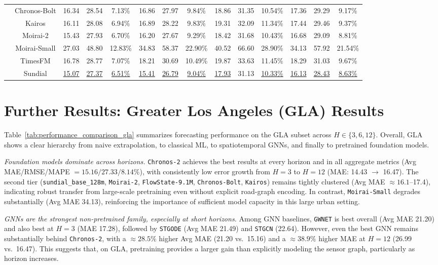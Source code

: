 \documentclass[10pt]{article}
\begin{document}
\begin{table}[t]
{\begin{tabular}{c|c|c|c|c|c|c|c|c|c|c|c|c|c}
& Chronos-Bolt & 16.34 & 28.54 & 7.13\% & 16.86 & 27.97 & 9.84\% & 18.86 & 31.35 & 10.54\% & 17.36 & 29.29 & 9.17\% \\
& Kairos & 16.11 & 28.08 & 6.94\% & 16.89 & 28.22 & 9.83\% & 19.31 & 32.09 & 11.34\% & 17.44 & 29.46 & 9.37\% \\
& Moirai-2 & 15.43 & 27.93 & 6.70\% & 16.20 & 27.67 & 9.29\% & 18.42 & 31.68 & 10.43\% & 16.68 & 29.09 & 8.81\% \\
& Moirai-Small & 27.03 & 48.80 & 12.83\% & 34.83 & 58.37 & 22.90\% & 40.52 & 66.60 & 28.90\% & 34.13 & 57.92 & 21.54\% \\
& TimesFM & 16.78 & 28.77 & 7.07\% & 18.21 & 30.69 & 10.49\% & 19.87 & 33.63 & 11.45\% & 18.29 & 31.03 & 9.67\% \\
& Sundial& \underline{15.07} & \underline{27.37} & \underline{6.51\%} & \underline{15.41} & \underline{26.79} & \underline{9.04\%} & \underline{17.93} & 31.13 & \underline{10.33\%} & \underline{16.13} & \underline{28.43} & \underline{8.63\%} \\
\bottomrule
\end{tabular}
}
\end{table}


\section{Further Results: Greater Los Angeles (GLA) Results}
\label{sec:gla_results}

Table~\ref{tab:performance_comparison_gla} summarizes forecasting performance on the GLA subset across
$H\in\{3,6,12\}$. Overall, GLA shows a clear hierarchy from naive extrapolation, to classical ML, to
spatiotemporal GNNs, and finally to pretrained foundation models.

\textit{Foundation models dominate across horizons.}
\texttt{Chronos-2} achieves the best results at every horizon and in all aggregate metrics
(Avg MAE/RMSE/MAPE $=15.16/27.33/8.14\%$), with consistently low error growth from $H=3$ to $H=12$
(MAE: 14.43 $\rightarrow$ 16.47). The second tier (\texttt{sundial\_base\_128m}, \texttt{Moirai-2},
\texttt{FlowState-9.1M}, \texttt{Chronos-Bolt}, \texttt{Kairos}) remains tightly clustered
(Avg MAE $\approx 16.1$--17.4), indicating robust transfer from large-scale pretraining even without explicit
road-graph encoding. In contrast, \texttt{Moirai-Small} degrades substantially (Avg MAE 34.13), reinforcing the
importance of sufficient model capacity in this large urban setting.

\textit{GNNs are the strongest non-pretrained family, especially at short horizons.}
Among GNN baselines, \texttt{GWNET} is best overall (Avg MAE 21.20) and also best at $H=3$ (MAE 17.28),
followed by \texttt{STGODE} (Avg MAE 21.49) and \texttt{STGCN} (22.64). However, even the best GNN remains
substantially behind \texttt{Chronos-2}, with a $\approx 28.5\%$ higher Avg MAE (21.20 vs.\ 15.16) and a
$\approx 38.9\%$ higher MAE at $H=12$ (26.99 vs.\ 16.47). This suggests that, on GLA, pretraining provides a
larger gain than explicitly modeling the sensor graph, particularly as horizon increases.
\end{document}
